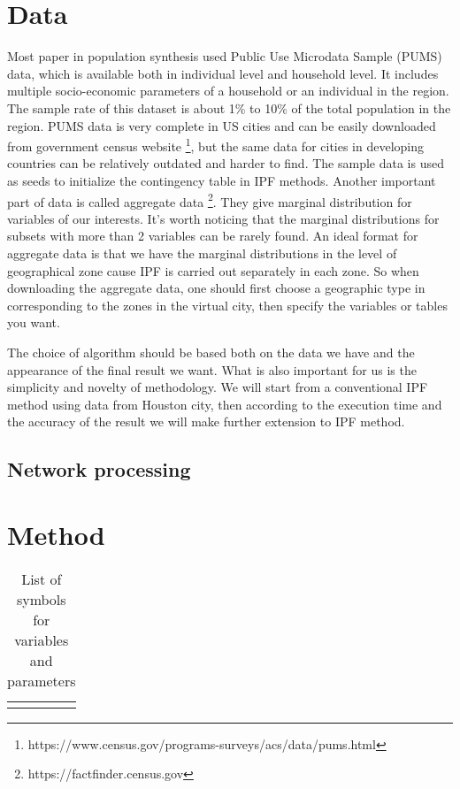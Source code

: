 \documentclass[11pt,twoside]{article}
\numberwithin{equation}{section}
\newcommand{\?}{\stackrel{?}{=}}
\begin{document}
\section{Data}
Most paper in population synthesis used Public Use Microdata Sample (PUMS) data, which is available both in individual level and household level.
It includes multiple socio-economic parameters of a household or an individual in the region.
The sample rate of this dataset is about 1\% to 10\% of the total population in the region. 
PUMS data is very complete in US cities and can be easily downloaded from government census website \footnote{https://www.census.gov/programs-surveys/acs/data/pums.html}, but the same data for cities in developing countries can be relatively outdated and harder to find. The sample data is used as seeds to initialize the contingency table in IPF methods. Another important part of data is called aggregate data \footnote{https://factfinder.census.gov}. They give marginal distribution for variables of our interests. It's worth noticing that the marginal distributions for subsets with more than 2 variables can be rarely found. An ideal format for aggregate data is that we have the marginal distributions in the level of geographical zone cause IPF is carried out separately in each zone. So when downloading the aggregate data, one should first choose a geographic type in corresponding to the zones in the virtual city, then specify the variables or tables you want.

The choice of algorithm should be based both on the data we have and the appearance of the final result we want.
What is also important for us is the simplicity and novelty of methodology. We will start from a conventional IPF method using data from Houston city, then according to the execution time and the accuracy of the result we will make further extension to IPF method.


\subsection{Network processing}

\section{Method}


\begin{table}[h!]
  \centering
  \begin{tabular}{l l l}
    &&
  \end{tabular}
  \caption{List of symbols for variables and parameters}
  \label{tab:symbols}
\end{table}
\end{document}

